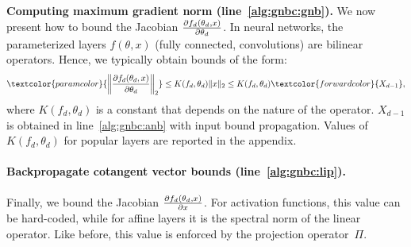       
    \textbf{Computing maximum gradient norm (line~\ref{alg:gnbc:gnb}).} We now present how to bound the Jacobian $\frac{\partial f_d(\theta_d,x)}{\partial \theta_d}$. In neural networks, the parameterized layers $f(\theta,x)$ (fully connected, convolutions) are bilinear operators. Hence, we typically obtain bounds of the form:
    \begin{equation} \label{eq:max_grad_norm}
    \textcolor{paramcolor}{\left\|\Jac{f_d(\theta_d,x)}{\theta_d}\right\|_2}\leq K(f_d,\theta_d)\|x\|_2\leq K(f_d,\theta_d)\textcolor{forwardcolor}{X_{d-1}},
    \end{equation}
    where $K(f_d,\theta_d)$ is a constant that depends on the nature of the operator. $X_{d-1}$ is obtained in line~\ref{alg:gnbc:anb} with input bound propagation. Values of $K(f_d,\theta_d)$ for popular layers are reported in the appendix.
    \paragraph{Backpropagate cotangent vector bounds (line~\ref{alg:gnbc:lip}).} Finally, we bound the Jacobian \textcolor{backwardcolor}{$\frac{\partial f_d(\theta_d,x)}{\partial x}$}. For activation functions, this value can be hard-coded, while for affine layers it is the spectral norm of the linear operator. Like before, this value is enforced by the projection operator~$\Pi$.
    

